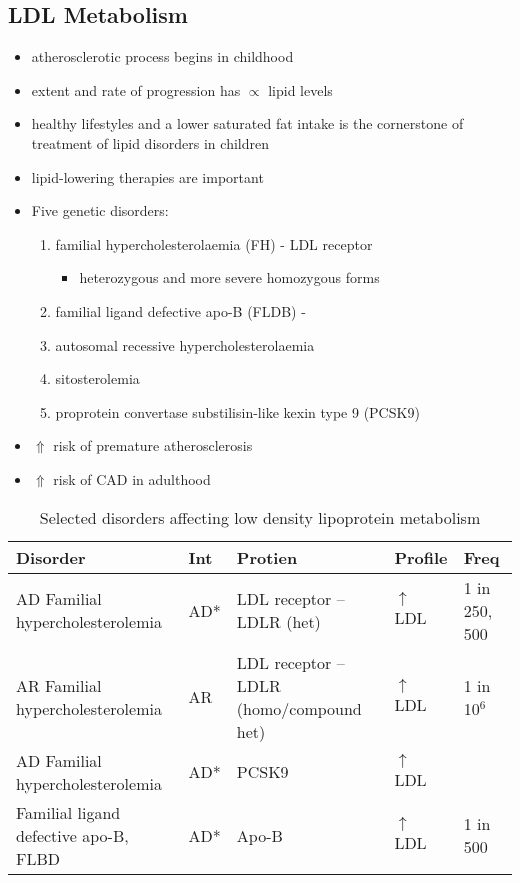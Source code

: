 \documentclass{scrartcl}
\begin{document}
\subsection{LDL Metabolism}
\label{sec:org8e8f063}
\begin{itemize}
\item atherosclerotic process begins in childhood
\item extent and rate of progression has \(\propto\) lipid levels
\item healthy lifestyles and a lower saturated fat intake is the
cornerstone of treatment of lipid disorders in children
\item lipid-lowering therapies are important

\item Five genetic disorders:
\begin{enumerate}
\item familial hypercholesterolaemia (FH) - LDL receptor
\begin{itemize}
\item heterozygous and more severe homozygous forms
\end{itemize}
\item familial ligand defective apo-B (FLDB) -
\item autosomal recessive hypercholesterolaemia
\item sitosterolemia
\item proprotein convertase substilisin-like kexin type 9 (PCSK9)
\end{enumerate}
\item \(\Uparrow\) risk of premature atherosclerosis
\item \(\Uparrow\) risk of CAD in adulthood
\end{itemize}

\begin{table}[htbp]
\caption{\label{tab:orgfb3e1dc}
Selected disorders affecting low density lipoprotein metabolism}
\centering
\begin{tabular}{lllll}
Disorder & Int & Protien & Profile & Freq\\
\hline
AD Familial hypercholesterolemia & AD* & LDL receptor – LDLR (het) & \(\uparrow\) LDL & 1 in 250, 500\\
AR Familial hypercholesterolemia & AR & LDL receptor – LDLR  (homo/compound het) & \(\uparrow\) LDL & 1 in 10\(^{\text{6}}\)\\
AD Familial hypercholesterolemia & AD* & PCSK9 & \(\uparrow\) LDL & \\
Familial ligand defective apo-B, FLBD & AD* & Apo-B & \(\uparrow\) LDL & 1 in 500\\
\end{tabular}
\end{table}
\end{document}
